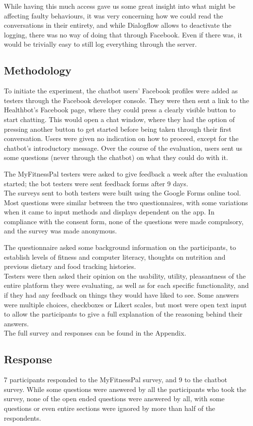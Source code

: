 While having this much access gave us some great insight into what might be affecting faulty behaviours, it was very concerning how we could read the conversations in their entirety, and while Dialogflow allows to deactivate the logging, there was no way of doing that through Facebook. Even if there was, it would be trivially easy to still log everything through the server.
\subsection{Methodology}
To initiate the experiment, the chatbot users' Facebook profiles were added as testers through the Facebook developer console. They were then sent a link to the Healthbot's Facebook page, where they could press a clearly visible button to start chatting. This would open a chat window, where they had the option of pressing another button to get started before being taken through their first conversation. Users were given no indication on how to proceed, except for the chatbot's introductory message. Over the course of the evaluation, users sent us some questions (never through the chatbot) on what they could do with it. 

The MyFitnessPal testers were asked to give feedback a week after the evaluation started; the bot testers were sent feedback forms after 9 days.\\
The surveys sent to both testers were built using the Google Forms online tool. Most questions were similar between the two questionnaires, with some variations when it came to input methods and displays dependent on the app. In compliance with the consent form, none of the questions were made compulsory, and the survey was made anonymous.

The questionnaire asked some background information on the participants, to establish levels of fitness and computer literacy, thoughts on nutrition and previous dietary and food tracking histories.\\
Testers were then asked their opinion on the usability, utility, pleasantness of the entire platform they were evaluating, as well as for each specific functionality, and if they had any feedback on things they would have liked to see. Some answers were multiple choices, checkboxes or Likert scales, but most were open text input to allow the participants to give a full explanation of the reasoning behind their answers.\\
The full survey and responses can be found in the Appendix.
\subsection{Response}
7 participants responded to the MyFitnessPal survey, and 9 to the chatbot survey. While some questions were answered by all the participants who took the survey, none of the open ended questions were answered by all, with some questions or even entire sections were ignored by more than half of the respondents. 

